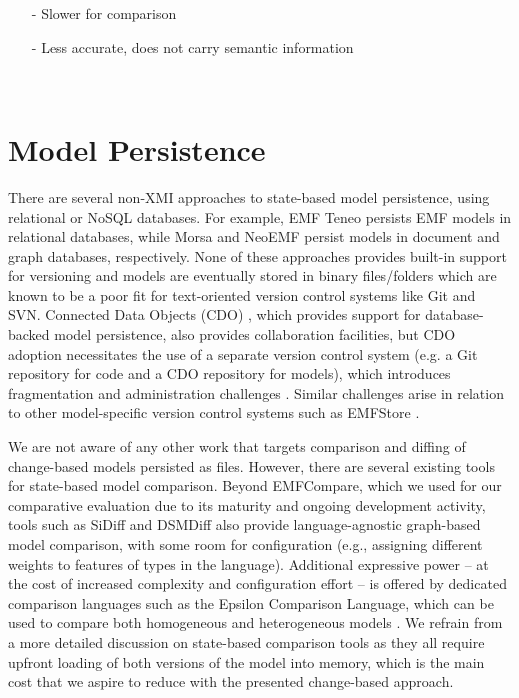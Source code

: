 \begin{table}[t!]
\begin{tabular}
\begin{minipage}[t]{4.7cm}
\begin{itemize}[leftmargin=9pt]
                \item[-] Slower for comparison \cite{DBLP:conf/edoc/KoegelHLHD10}
                \item[-] Less accurate, does not carry semantic information \cite{mens2002state,DBLP:conf/edoc/KoegelHLHD10}  
            \end{itemize}
        \end{minipage}
        \\
        \hline
    \end{tabular} 
\end{table}

\section{Model Persistence}
\label{model_persistence}
There are several non-XMI approaches to state-based model persistence, using relational or NoSQL databases. For example, EMF Teneo \cite{eclipse2017teneo} persists EMF models in relational databases, while Morsa \cite{DBLP:conf/models/Espinazo-PaganCM11} and NeoEMF \cite{daniel2016neoemf} persist models in document and graph databases, respectively. None of these approaches provides built-in support for versioning and models are eventually stored in binary files/folders which are known to be a poor fit for text-oriented version control systems like Git and SVN. Connected Data Objects (CDO) \cite{eclipse2017cdo}, which provides support for database-backed model persistence, also provides collaboration facilities, but CDO adoption necessitates the use of a separate version control system (e.g. a Git repository for code and a CDO repository for models), which introduces fragmentation and administration challenges \cite{barmpis2014evaluation}. Similar challenges arise in relation to other model-specific version control systems such as EMFStore \cite{koegel2010emfstore}.

We are not aware of any other work that targets comparison and diffing of change-based models persisted as files. However, there are several existing tools for state-based model comparison. Beyond EMFCompare, which we used for our comparative evaluation due to its maturity and ongoing development activity, tools such as SiDiff \cite{Treude2007SiDiff} and DSMDiff \cite{lin2009dsmdiff} also provide language-agnostic graph-based model comparison, with some room for configuration (e.g., assigning different weights to features of types in the language). Additional expressive power -- at the cost of increased complexity and configuration effort -- is offered by dedicated comparison languages such as the Epsilon Comparison Language, which can be used to compare both homogeneous and heterogeneous models \cite{kolovos2009ecl}. We refrain from a more detailed discussion on state-based comparison tools as they all require upfront loading of both versions of the model into memory, which is the main cost that we aspire to reduce with the presented change-based approach.


